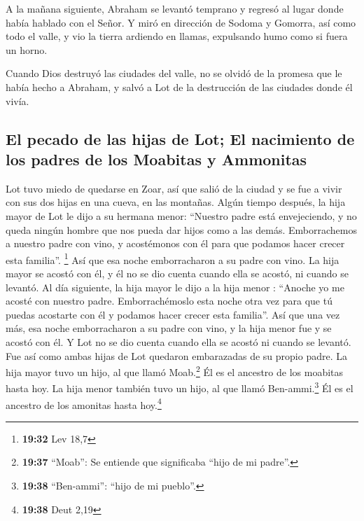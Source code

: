  A la mañana siguiente, Abraham se levantó temprano y
regresó al lugar donde había hablado con el Señor.  Y
miró en dirección de Sodoma y Gomorra, así como todo el valle, y vio la
tierra ardiendo en llamas, expulsando humo como si fuera un horno.

 Cuando Dios destruyó las ciudades del valle, no se
olvidó de la promesa que le había hecho a Abraham, y salvó a Lot de la
destrucción de las ciudades donde él vivía.

\hypertarget{el-pecado-de-las-hijas-de-lot-el-nacimiento-de-los-padres-de-los-moabitas-y-ammonitas}{%
\subsection{El pecado de las hijas de Lot; El nacimiento de los padres
de los Moabitas y
Ammonitas}\label{el-pecado-de-las-hijas-de-lot-el-nacimiento-de-los-padres-de-los-moabitas-y-ammonitas}}

 Lot tuvo miedo de quedarse en Zoar, así que salió de la
ciudad y se fue a vivir con sus dos hijas en una cueva, en las montañas.
 Algún tiempo después, la hija mayor de Lot le dijo a su
hermana menor: ``Nuestro padre está envejeciendo, y no queda ningún
hombre que nos pueda dar hijos como a las demás. 
Emborrachemos a nuestro padre con vino, y acostémonos con él para que
podamos hacer crecer esta familia''. \footnote{\textbf{19:32} Lev 18,7}
 Así que esa noche emborracharon a su padre con vino. La
hija mayor se acostó con él, y él no se dio cuenta cuando ella se
acostó, ni cuando se levantó.  Al día siguiente, la hija
mayor le dijo a la hija menor : ``Anoche yo me acosté con nuestro padre.
Emborrachémoslo esta noche otra vez para que tú puedas acostarte con él
y podamos hacer crecer esta familia''.  Así que una vez
más, esa noche emborracharon a su padre con vino, y la hija menor fue y
se acostó con él. Y Lot no se dio cuenta cuando ella se acostó ni cuando
se levantó.  Fue así como ambas hijas de Lot quedaron
embarazadas de su propio padre.  La hija mayor tuvo un
hijo, al que llamó Moab.\footnote{\textbf{19:37} ``Moab'': Se entiende
  que significaba ``hijo de mi padre''.} Él es el ancestro de los
moabitas hasta hoy.  La hija menor también tuvo un hijo,
al que llamó Ben-ammi.\footnote{\textbf{19:38} ``Ben-ammi'': ``hijo de
  mi pueblo''.} Él es el ancestro de los amonitas hasta hoy.\footnote{\textbf{19:38}
  Deut 2,19}


